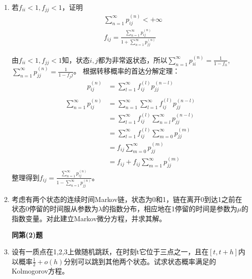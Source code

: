 \begin{enumerate}
\begin{enumerate}[\bfseries (1)]
	      \end{enumerate}
	\item 若\(f_{ii}<1,f_{jj}<1\)，证明
	      \begin{align*}
		       & \sum_{n=1}^{\infty}p_{ij}^{(n)}<+\infty                                            \\
		       & f_{ij}  =\frac{\sum_{n=1}^{\infty}p_{ij}^{(n)}}{1+\sum_{n=1}^{\infty}p_{jj}^{(n)}}
	      \end{align*}

	      由\(f_{ii}<1,f_{jj}<1\)知，状态\(i,j\)都为非常返状态，所以\(\sum_{n=1}^{\infty}p_{ii}^{(n)}=\frac{1}{1-f_{ii}}\),\(\sum_{n=1}^{\infty}p_{jj}^{(n)}=\frac{1}{1-f_jj}\)。
	      根据转移概率的首达分解定理：
	      \begin{align*}
		      p^{(n)}_{ij}
		       & =\sum_{l=1}^{\infty}f_{ij}^{(l)}p_{jj}^{(n-l)} \\
	      \end{align*}
	      \begin{align*}
		      \sum_{n=1}^{\infty}p_{ij}^{(n)}
		       & =\sum_{n=1}^{\infty}\sum_{l=1}^{\infty}f_{ij}^{(l)}p_{jj}^{(n-l)} \\
		       & =\sum_{l=1}^{\infty}f_{ij}^{(l)}\sum_{n=l}^{\infty}p_{jj}^{(n-l)} \\
		       & =\sum_{l=1}^{\infty}f_{ij}^{(l)}\sum_{m=0}^{\infty}p_{jj}^{(m)}   \\
		       & =f_{ij}\sum_{m=0}^{\infty}p_{jj}^{(m)}                            \\
		       & =f_{ij}+f_{ij}\sum_{m=1}^{\infty}p_{jj}^{(m)}
	      \end{align*}
	      整理得到\(f_{ij}=\frac{\sum_{n=1}^{\infty}p_{ij}^{(n)}}{1-\sum_{n=1}^{\infty}p_{jj}^{(n)}}\)。
	\item 考虑有两个状态的连续时间Markov链，状态为0和1，链在离开0到达1之前在状态0停留的时间服从参数为\(\lambda\)的指数分布，相应地在1停留的时间是参数为\(\mu\)的指数变量。对此建立Markov微分方程，并求其解。

	      \textbf{同第(2)题}
	\item 设有一质点在1,2,3上做随机跳跃，在时刻t它位于三点之一，且在\([t,t+h]\)内以概率\(\frac{1}{2}+o(h)\)分别可以跳到其他两个状态。试求状态概率满足的Kolmogorov方程。


\end{enumerate}
